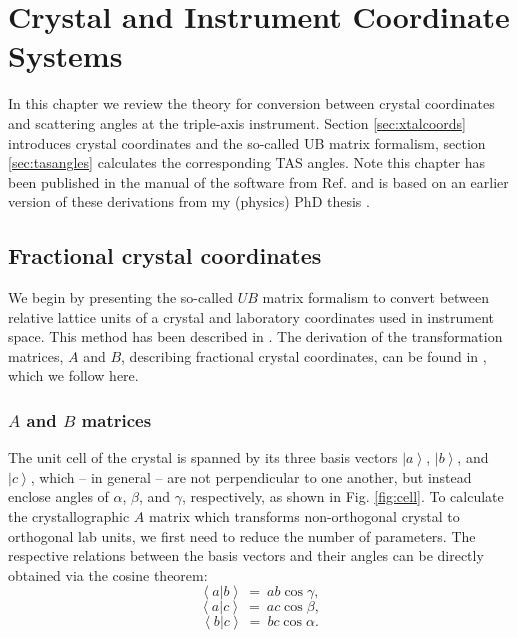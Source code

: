 %
%


\chapter{Crystal and Instrument Coordinate Systems}
\label{ch:xtal}

In this chapter we review the theory for conversion between crystal coordinates and scattering angles at the triple-axis instrument. Section \ref{sec:xtalcoords} introduces crystal coordinates and the so-called UB matrix formalism, section \ref{sec:tasangles} calculates the corresponding TAS angles. Note this chapter has been published in the manual of the software from Ref. \cite{Takin2021} and is based on an earlier version of these derivations from my (physics) PhD thesis \cite[pp. 139-143]{PhDWeber}.


\section{Fractional crystal coordinates \label{sec:xtalcoords}}

We begin by presenting the so-called $UB$ matrix formalism to convert between relative lattice units of a crystal and laboratory coordinates used in instrument space. This method has been described in \cite{Lumsden2005}. The derivation of the transformation matrices, $A$ and $B$, describing fractional crystal coordinates, can be found in \cite{wiki_fractional}, which we follow here.

\subsection{$A$ and $B$ matrices}
The unit cell of the crystal is spanned by its three basis vectors $\left| a \right>$, $\left| b \right>$, and $\left| c \right>$, which -- in general -- are not perpendicular to one another, but instead enclose angles of $\alpha$, $\beta$, and $\gamma$, respectively, as shown in Fig. \ref{fig:cell}. 
To calculate the crystallographic $A$ matrix which transforms non-orthogonal crystal to orthogonal lab units, we first need to reduce the number of parameters.
The respective relations between the basis vectors and their angles can be directly obtained via the cosine theorem:
\begin{equation} \left< a | b \right > \ =\  ab \cos \gamma, \label{ab} \end{equation}
\begin{equation} \left< a | c \right > \ =\  ac \cos \beta, \label{ac} \end{equation}
\begin{equation} \left< b | c \right > \ =\  bc \cos \alpha. \label{bc} \end{equation}

